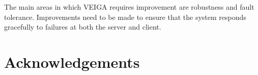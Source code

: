 \documentclass[a4paper]{article}
\begin{document}
\begin{multicols}{2}
The main areas in which VEIGA requires improvement are robustness and fault tolerance.  Improvements need to be made to ensure that the system responds gracefully to failures at both the server and client.

\section*{Acknowledgements}


\end{multicols}



\end{document}

